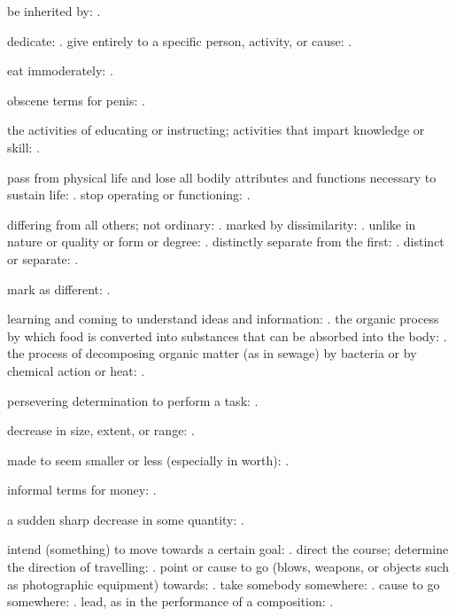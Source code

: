   be inherited by: .

  dedicate: . give entirely to a specific person, activity, or cause: .

  eat immoderately: .

  obscene terms for penis: .

  the activities of educating or instructing; activities that impart knowledge or skill: .

  pass from physical life and lose all bodily attributes and functions necessary to sustain life: . stop operating or functioning: .

  differing from all others; not ordinary: . marked by dissimilarity: . unlike in nature or quality or form or degree: . distinctly separate from the first: . distinct or separate: .

  mark as different: .

  learning and coming to understand ideas and information: . the organic process by which food is converted into substances that can be absorbed into the body: . the process of decomposing organic matter (as in sewage) by bacteria or by chemical action or heat: .

  persevering determination to perform a task: .

  decrease in size, extent, or range: .

  made to seem smaller or less (especially in worth): .

  informal terms for money: .

  a sudden sharp decrease in some quantity: .

  intend (something) to move towards a certain goal: . direct the course; determine the direction of travelling: . point or cause to go (blows, weapons, or objects such as photographic equipment) towards: . take somebody somewhere: . cause to go somewhere: . lead, as in the performance of a composition: .

